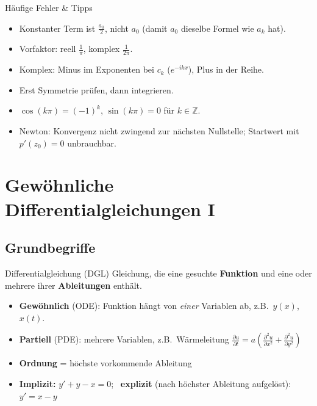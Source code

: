 \documentclass[a4paper, fontsize=7pt]{scrartcl}
\def\Z{\mathbb{Z}}  %
\newcommand{\pdn}[2]{\frac{\partial #1}{\partial #2}}
\begin{document}
\begin{subbox}{Häufige Fehler \& Tipps}
\begin{itemize}
    \item Konstanter Term ist $\frac{a_0}{2}$, nicht $a_0$ (damit $a_0$
          dieselbe Formel wie $a_k$ hat).
    \item Vorfaktor: reell $\frac{1}{\pi}$, komplex $\frac{1}{2\pi}$.
    \item Komplex: Minus im Exponenten bei $c_k$ ($e^{-ikx}$), Plus in
          der Reihe.
    \item Erst Symmetrie prüfen, dann integrieren.
    \item $\cos(k\pi) = (-1)^k$, $\sin(k\pi) = 0$ für $k \in \Z$.
    \item Newton: Konvergenz nicht zwingend zur nächsten Nullstelle;
          Startwert mit $p'(z_0) = 0$ unbrauchbar.
\end{itemize}
\end{subbox}

\section{Gewöhnliche Differentialgleichungen I}

\subsection{Grundbegriffe}

\begin{mainbox}{Differentialgleichung (DGL)}
Gleichung, die eine gesuchte \textbf{Funktion} und eine oder mehrere ihrer
\textbf{Ableitungen} enthält.
\begin{itemize}
    \item \textbf{Gewöhnlich} (ODE): Funktion hängt von \emph{einer}
          Variablen ab, z.B.\ $y(x)$, $x(t)$.
    \item \textbf{Partiell} (PDE): mehrere Variablen, z.B.\
          Wärmeleitung $\pdn{u}{t} = a\left(\pdn{^2u}{x^2} +
          \pdn{^2u}{y^2}\right)$
    \item \textbf{Ordnung} = höchste vorkommende Ableitung
    \item \textbf{Implizit:} $y' + y - x = 0$; \
          \textbf{explizit} (nach höchster Ableitung aufgelöst):
          $y' = x - y$
\end{itemize}
\end{mainbox}
\end{document}
